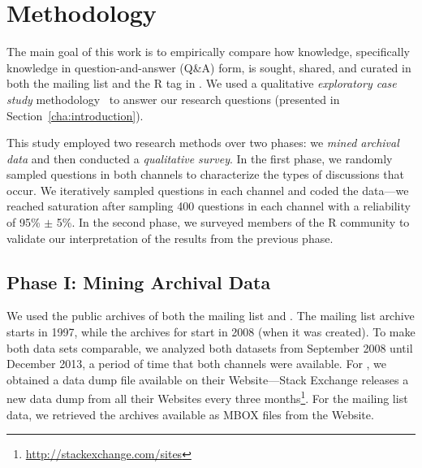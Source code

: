 \section{Methodology}
\label{cha:methodology}

The main goal of this work is to empirically compare how knowledge, specifically knowledge in question-and-answer (Q\&A) form, is sought, shared, and curated in both the \RH mailing list and the R tag in \SO. We used a qualitative \textit{exploratory case study} methodology~\cite{Creswell2009,Runeson2012} to answer our research questions (presented in Section~\ref{cha:introduction}).


This study employed two research methods over two phases: we \textit{mined archival data} and then conducted a \textit{qualitative survey}. In the first phase, we randomly sampled questions in both channels to characterize the types of discussions that occur. We iteratively sampled questions in each channel and coded the data---we reached saturation after sampling 400 questions in each channel with a reliability of 95\% $\pm$ 5\%. In the second phase, we surveyed members of the R community to validate our interpretation of the results from the previous phase. %

\subsection{Phase I: Mining Archival Data} 
\label{sec:studyDesign}
We used the public archives of both	the \RH mailing list and \SO. The \RH mailing list archive starts in 1997, while the archives for \SO start in 2008 (when it was created).
To make both data sets comparable, we analyzed both datasets from September 2008 until December 2013, a period of time that both channels were available.
For \SO, we obtained a data dump file available on their Website---Stack Exchange releases a new data dump from all their Websites every three months\footnote{\url{http://stackexchange.com/sites}}. For the \RH mailing list data, we retrieved the archives available as MBOX files from the \RH Website.

